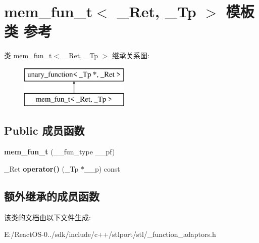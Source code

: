 \hypertarget{classmem__fun__t}{}\section{mem\+\_\+fun\+\_\+t$<$ \+\_\+\+Ret, \+\_\+\+Tp $>$ 模板类 参考}
\label{classmem__fun__t}
类 mem\+\_\+fun\+\_\+t$<$ \+\_\+\+Ret, \+\_\+\+Tp $>$ 继承关系图\+:\begin{figure}[H]
\begin{center}
\leavevmode
\includegraphics[height=2.000000cm]{classmem__fun__t}
\end{center}
\end{figure}
\subsection*{Public 成员函数}
\begin{DoxyCompactItemize}
\item 
\mbox{\label{classmem__fun__t_a2b9073a80123efe05e177868ae6854ba}} 
{\bfseries mem\+\_\+fun\+\_\+t} (\+\_\+\+\_\+fun\+\_\+type \+\_\+\+\_\+pf)
\item 
\mbox{\label{classmem__fun__t_a5dfff6da8e272c713a813208e9027e89}} 
\+\_\+\+Ret {\bfseries operator()} (\+\_\+\+Tp $\ast$\+\_\+\+\_\+p) const
\end{DoxyCompactItemize}
\subsection*{额外继承的成员函数}


该类的文档由以下文件生成\+:\begin{DoxyCompactItemize}
\item 
E\+:/\+React\+O\+S-\/0../sdk/include/c++/stlport/stl/\+\_\+function\+\_\+adaptors.\+h\end{DoxyCompactItemize}
